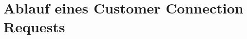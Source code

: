 \begin{comment}

Wiederverwendung:
Wiederverwendung des Inhalts von Konstruktionsmodellen bei dem Erstellen neuer Modelle 
Beziehung zwischen Referenz- und Anwendungsmodell dadurch gekennzeichnet ist, dass Gegenstand oder Inhalt des Referenzmodells bei der Konstruktion des Gegenstands oder Inhalts des Anwendungsmodells wieder verwendet werden
Modell, das Menschen bei der Konstruktion von Anwendungsmodellen unterstützt
Definition: Modell ist ein Referenzmodell, wenn es wiederverwendet wird oder für den Zweck der Wiederverwendung entwickelt wurde 
Empfehlung, die einen Bezugspunkt für andere Modelle schafft.
Nutzorientierte Sichweise

Anspruch auf Allgemeingültig; 
Sollempfehlungen für eine Klasse abstrakter Anwendungsgebiete, Modell für eine Klasse von Problemen einsetzbar, es muss mindestens potentiell für die Nutzung weiterer Modelle nützlich sein

Empfehlugnscharakter: 
Angepasst oder erweitert werden; 
werden zur inhaltlichen Unterstützung bei der Erstellung von Anwendungsmodellen entwickelt oder genutzt
Anpassung des Modells an die spezifischen Gegebenheiten: HARS
Ziel:
Referenzmodelle sind Hilfsmittel um die Effektivität und Effizienz in der Modellierung zu steigern
Kosten und Zeit des Konstruktionsprozesses = Effizienz, Effektivität = Modelqualität, Ergebnisqualität
Ziel: Ausgangslösung wird modifiziert um die  Wirtschaftlichkeit durch den Transfer von betriebswirtschaftlichem Know-How  zu steigern
Ergebnis neuer Modelle abhängig von derQualität des Referenzmodells 

Zusatznutzen Subjektiv: Negativ Punkt abräumen
Risiko, dass die Eigenschaften Allgemeingültigkeit und Empfehlungscharakter subjektiv sind
Weiterhin muss das Referenzmodell den Anwendern einen Zusatznutzen zu bestehenden Ansätzen zur Verfügung stellen. Da der Zusatznutzen nur subjektiv messbar ist, hat seine Validierung durch den Anwenderkreis zu erfolgen
Risikominimierung

Einsatzgebiet
Zuerst bei Informationmodellierung eingesetzt
Praxis: Entwicklung und Customizing
Nutzen durch Wert- und Mengenkomponente determiniert, für einmalige Anwendung als auch für Mehrfachanwendung geeignet
\end{comment}


\section{Ablauf eines Customer Connection Requests}



